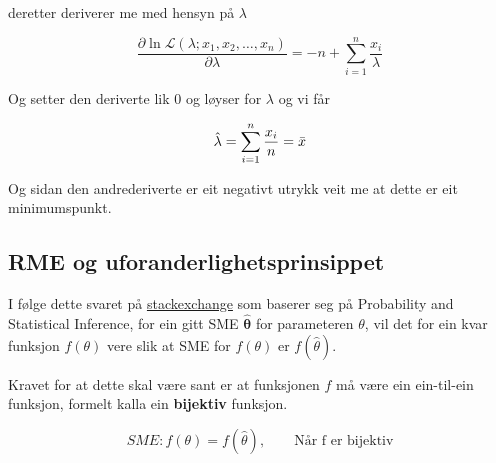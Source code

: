 deretter deriverer me med hensyn på $\lambda$

\begin{equation}
  \frac{\partial \ln \mathcal{L}(\lambda; x_1, x_2, \dots, x_n)}{\partial\lambda}  = -n + \sum_{i=1}^n \frac{x_i}{\lambda}
\end{equation}

Og setter den deriverte lik $0$ og løyser for $\lambda$ og vi får

\begin{equation}
    \hat{\lambda} = \sum_{i=1}^n \frac{x_i}{n} = \Bar{x}
\end{equation}

Og sidan den andrederiverte er eit negativt utrykk veit me at dette er eit minimumspunkt.

\subsection{RME og uforanderlighetsprinsippet}
I følge dette svaret på \href{https://stats.stackexchange.com/questions/77573/invariance-property-of-mle-what-is-the-mle-of-theta2-of-normal-barx2}{stackexchange} som baserer seg på Probability and Statistical Inference\cite{mukhopadhyay2020probability}, for ein gitt SME $\boldsymbol{\hat{\theta}}$ for parameteren $\theta$, vil det for ein kvar funksjon $f(\theta)$ vere slik at SME for $f(\theta)$ er $f(\hat{\theta})$.

Kravet for at dette skal være sant er at funksjonen $f$ må være ein ein-til-ein funksjon, formelt kalla ein \textbf{bijektiv} funksjon.

\begin{equation}
    SME: f(\theta) = f(\hat{\theta}), \qquad \text{Når f er bijektiv}
\end{equation}